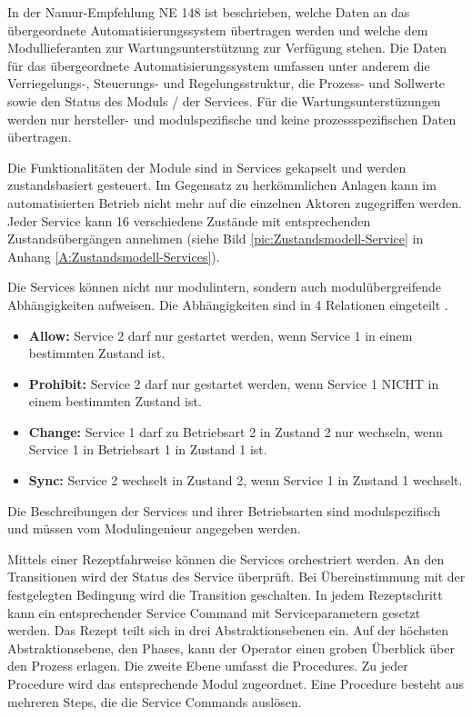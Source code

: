 In der Namur-Empfehlung NE 148 \cite{NAMURArbeitskreis1.122013} ist beschrieben, welche Daten an das übergeordnete Automatisierungssystem übertragen werden und welche dem Modullieferanten zur Wartungsunterstützung zur Verfügung stehen. Die Daten für das übergeordnete Automatisierungssystem umfassen unter anderem die Verriegelungs-, Steuerungs- und Regelungsstruktur, die Prozess- und Sollwerte sowie den Status des Moduls / der Services. Für die Wartungsunterstüzungen werden nur hersteller- und modulspezifische und keine prozessspezifischen Daten übertragen.

Die Funktionalitäten der Module sind in Services gekapselt und werden zustandsbasiert gesteuert. Im Gegensatz zu herkömmlichen Anlagen kann im automatisierten Betrieb nicht mehr auf die einzelnen Aktoren zugegriffen werden. Jeder Service kann 16 verschiedene Zustände mit entsprechenden Zustandsübergängen annehmen (siehe Bild \ref{pic:Zustandsmodell-Service} in Anhang \ref{A:Zustandsmodell-Services}).

Die Services können nicht nur modulintern, sondern auch modulübergreifende Abhängigkeiten aufweisen. Die Abhängigkeiten sind in 4 Relationen eingeteilt \cite{Ladiges2018}.
\begin{itemize}
\item \textbf{Allow:} Service 2 darf nur gestartet werden, wenn Service 1 in einem bestimmten Zustand ist.
\item \textbf{Prohibit:} Service 2 darf nur gestartet werden, wenn Service 1 NICHT in einem bestimmten Zustand ist.
\item \textbf{Change:} Service 1 darf zu Betriebsart 2 in Zustand 2 nur wechseln, wenn Service 1 in Betriebsart 1 in Zustand 1 ist.
\item \textbf{Sync:} Service 2 wechselt in Zustand 2, wenn Service 1 in Zustand 1 wechselt.
\end{itemize} 
Die Beschreibungen der Services und ihrer Betriebsarten sind modulspezifisch und müssen vom Modulingenieur angegeben werden.

Mittels einer Rezeptfahrweise können die Services orchestriert werden. An den Transitionen wird der Status des Service überprüft. Bei Übereinstimmung mit der festgelegten Bedingung wird die Transition geschalten. In jedem Rezeptschritt kann ein entsprechender Service Command mit Serviceparametern gesetzt werden. Das Rezept teilt sich in drei Abstraktionsebenen ein. Auf der höchsten Abstraktionsebene, den Phases, kann der Operator einen groben Überblick über den Prozess erlagen. Die zweite Ebene umfasst die Procedures. Zu jeder Procedure wird das entsprechende Modul zugeordnet. Eine Procedure besteht aus mehreren Steps, die die Service Commands auslösen. \cite{Bloch2017} 

